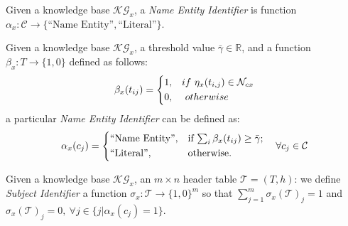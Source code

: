 \documentclass{llncs}
\begin{document}
\usetikzlibrary{arrows,automata}


\begin{definition}
      Given a knowledge base $\mathcal{KG}_x$, a \textit{Name Entity Identifier} is function $\alpha_x: \mathcal{C}\to \{\text{``Name Entity''}, \text{``Literal''} \}$.
\end{definition}

\begin{lemma}
      Given a knowledge base $\mathcal{KG}_x$, a threshold value $\bar{\gamma}\in \mathbb{R}$, and a function $\beta_x: T \to \{1,0\}$ defined as follows:
      \begin{equation}
            \beta_x(t_{ij})=
            \begin{dcases}
                  1, & if~  \eta_x(t_{i,j}) \in\mathcal{N}_{cx}
                  \\
                  0, & ~ otherwise
            \end{dcases}
      \end{equation}
      a particular \textit{Name Entity Identifier} can be defined as:
      \begin{equation}
            \alpha_x(c_{j})=
            \begin{dcases*}
                  \text{``Name Entity''}, & if  $\sum_i \beta_x(t_{ij})\geq\bar{\gamma}$;
                  \\
                  \text{``Literal''}, & otherwise.
            \end{dcases*}
            \ \ \forall c_j \in \mathcal{C}
      \end{equation}
\end{lemma}

\begin{definition}
      Given a knowledge base $\mathcal{KG}_x$, an $m\times n$ header table $\mathcal{T} =(T, h)$: we define \textit{Subject Identifier} a function $\sigma_x: \mathcal{T} \to \{1, 0\}^m$ so that $\displaystyle\sum^m_{j=1} \sigma_x(\mathcal{T})_j =1$ and $\sigma_x(\mathcal{T})_j = 0,~\forall j\in \{j | \alpha_x(c_j) =1\}$.
\end{definition}
\end{document}
